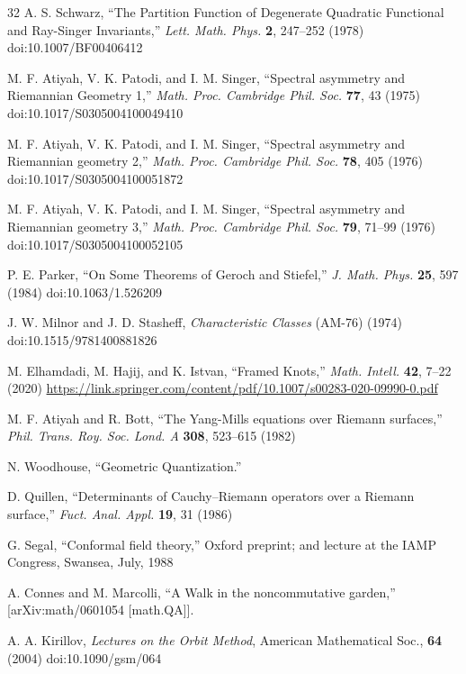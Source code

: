 \documentclass[11pt,a4paper]{article}
\begin{document}
\begin{thebibliography}{32}
 A. S. Schwarz, ``The Partition Function of Degenerate Quadratic Functional and Ray-Singer Invariants,'' \emph{Lett. Math. Phys.} \textbf{2}, 247--252 (1978) doi:10.1007/BF00406412

 M. F. Atiyah, V. K. Patodi, and I. M. Singer, ``Spectral asymmetry and Riemannian Geometry 1,'' \emph{Math. Proc. Cambridge Phil. Soc.} \textbf{77}, 43 (1975) doi:10.1017/S0305004100049410

 M. F. Atiyah, V. K. Patodi, and I. M. Singer, ``Spectral asymmetry and Riemannian geometry 2,'' \emph{Math. Proc. Cambridge Phil. Soc.} \textbf{78}, 405 (1976) doi:10.1017/S0305004100051872

 M. F. Atiyah, V. K. Patodi, and I. M. Singer, ``Spectral asymmetry and Riemannian geometry 3,'' \emph{Math. Proc. Cambridge Phil. Soc.} \textbf{79}, 71--99 (1976) doi:10.1017/S0305004100052105

 P. E. Parker, ``On Some Theorems of Geroch and Stiefel,'' \emph{J. Math. Phys.} \textbf{25}, 597 (1984) doi:10.1063/1.526209

 J. W. Milnor and J. D. Stasheff, \emph{Characteristic Classes} (AM-76) (1974) doi:10.1515/9781400881826

 M. Elhamdadi, M. Hajij, and K. Istvan, ``Framed Knots,'' \emph{Math. Intell.} \textbf{42}, 7--22 (2020) \href{https://link.springer.com/content/pdf/10.1007/s00283-020-09990-0.pdf}{https://link.springer.com/content/pdf/10.1007/s00283-020-09990-0.pdf}

 M. F. Atiyah and R. Bott, ``The Yang-Mills equations over Riemann surfaces,'' \emph{Phil. Trans. Roy. Soc. Lond. A} \textbf{308}, 523--615 (1982)

 N. Woodhouse, ``Geometric Quantization.''

 D. Quillen, ``Determinants of Cauchy--Riemann operators over a Riemann surface,'' \emph{Fuct. Anal. Appl.} \textbf{19}, 31 (1986)

 G. Segal, ``Conformal field theory,'' Oxford preprint; and lecture at the IAMP Congress, Swansea, July, 1988

 A. Connes and M. Marcolli, ``A Walk in the noncommutative garden,'' [arXiv:math/0601054 [math.QA]].

 A. A. Kirillov, \emph{Lectures on the Orbit Method}, American Mathematical Soc., \textbf{64} (2004) doi:10.1090/gsm/064


\end{thebibliography}
\end{document}
